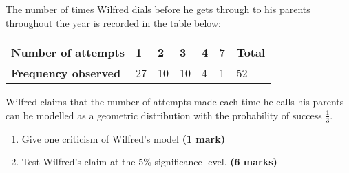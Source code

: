\documentclass[fleqn]{article}
\begin{document}
\begin{enumerate}
        The number of times Wilfred dials before he gets through to his parents throughout the year is recorded in the table below:\vspace{-1mm}
        \begin{center}
            \begin{tabularx}{0.75\textwidth}{|X|*6{P{12mm}|}}
                \hline
                \textbf{Number of attempts} & 1  & 2  & 3  & 4 & 7 & \textbf{Total}  \\\hline
                \textbf{Frequency observed} & 27 & 10 & 10 & 4 & 1 & 52              \\\hline
            \end{tabularx}
        \end{center}\vspace{3mm}
        Wilfred claims that the number of attempts made each time he calls his parents can be modelled as a geometric distribution with the probability of success $\frac{1}{3}$.
        \begin{enumerate}[label=\bfseries \alph*\space ]
            \item Give one criticism of Wilfred's model \hfill\textbf{(1 mark)}
            \item Test Wilfred's claim at the 5\% significance level. \hfill\textbf{(6 marks)}
        \end{enumerate}
\end{enumerate}
\end{document}
